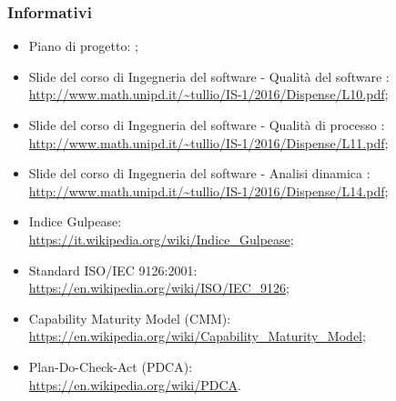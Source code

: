 \documentclass[PianoDiQualifica.tex]{subfiles}
\begin{document}
		\subsubsection{Informativi}
			\begin{itemize}
				\item Piano di progetto: \PPdocRR{};
				\item Slide del corso di Ingegneria del software - Qualità del software : \\
				\url{http://www.math.unipd.it/~tullio/IS-1/2016/Dispense/L10.pdf};
				\item Slide del corso di Ingegneria del software - Qualità di processo : \\
				\url{http://www.math.unipd.it/~tullio/IS-1/2016/Dispense/L11.pdf};
				\item Slide del corso di Ingegneria del software - Analisi dinamica : \\
				\url{http://www.math.unipd.it/~tullio/IS-1/2016/Dispense/L14.pdf};
				\item Indice Gulpease: \\
				\url{https://it.wikipedia.org/wiki/Indice_Gulpease};
				\item Standard ISO/IEC 9126:2001: \\
				\url{https://en.wikipedia.org/wiki/ISO/IEC_9126};
				\item Capability Maturity Model (CMM): \\
				\url{https://en.wikipedia.org/wiki/Capability_Maturity_Model};
				\item Plan-Do-Check-Act (PDCA): \\
				\url{https://en.wikipedia.org/wiki/PDCA}.
			\end{itemize}
			
\end{document}
